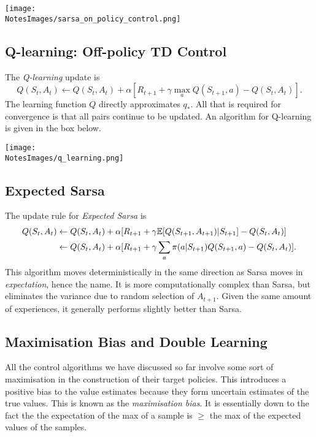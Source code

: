 \texttt{[image: \\NotesImages/sarsa\_on\_policy\_control.png]}

\subsection{Q-learning: Off-policy TD Control}
The \emph{Q-learning} update is 
\begin{equation}
    Q(S_t, A_t) \leftarrow Q(S_t, A_t) + \alpha [R_{t+1} + \gamma \max_a Q(S_{t+1}, a) - Q(S_t, A_t)].
\end{equation}
The learning function $Q$ directly approximates $q_*$. All that is required for convergence is that all pairs continue to be updated. An algorithm for Q-learning is given in the box below.

\texttt{[image: \\NotesImages/q\_learning.png]}

\subsection{Expected Sarsa}
The update rule for \emph{Expected Sarsa} is 
\begin{align}
        Q(S_t, A_t) & \leftarrow Q(S_t, A_t) + \alpha [R_{t+1} + \gamma \mathbb{E}{}[Q(S_{t+1}, A_{t+1})|S_{t+1}] - Q(S_t, A_t)] \\
                    & \leftarrow Q(S_t, A_t) + \alpha [R_{t+1} + \gamma \sum_a \pi(a|S_{t+1}) Q(S_{t+1}, a) - Q(S_t, A_t)].
\end{align}
This algorithm moves deterministically in the same direction as Sarsa moves in \emph{expectation}, hence the name. It is more computationally complex than Sarsa, but eliminates the variance due to random selection of $A_{t+1}$. Given the same amount of experiences, it generally performs slightly better than Sarsa.

\subsection{Maximisation Bias and Double Learning}
All the control algorithms we have discussed so far involve some sort of maximisation in the construction of their target policies. This introduces a positive bias to the value estimates because they form uncertain estimates of the true values. This is known as the \emph{maximisation bias}. It is essentially down to the fact the the expectation of the max of a sample is $\geq$ the max of the expected values of the samples.\\

